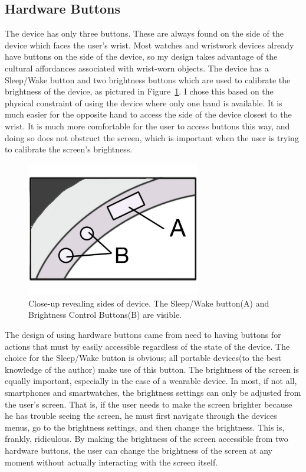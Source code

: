 \documentclass[11pt]{article}
\begin{document}
\subsection{Hardware Buttons}
The device has only three buttons. These are always found on the side of the device which faces the user's wrist. Most watches and wristwork devices already have buttons on the side of the device, so my design takes advantage of the cultural affordances associated with wrist-worn objects. The device has a Sleep/Wake button and two brightness buttons which are used to calibrate the brightness of the device, as pictured in Figure~\ref{fig:buttons}. I chose this based on the physical constraint of using the device where only one hand is available. It is much easier for the opposite hand to access the side of the device closest to the wrist. It is much more comfortable for the user to access buttons this way, and doing so does not obstruct the screen, which is important when the user is trying to calibrate the screen's brightness. 

\begin{figure}[H] %
   \centering
   \includegraphics[width=3in]{buttons.pdf}   
   \caption{Close-up revealing sides of device. The Sleep/Wake button(A) and Brightness Control Buttons(B) are visible.}
   \label{fig:buttons}
\end{figure}

The design of using hardware buttons came from need to having buttons for actions that must by easily accessible regardless of the state of the device. The choice for the Sleep/Wake button is obvious; all portable devices(to the best knowledge of the author) make use of this button. The brightness of the screen is equally important, especially in the case of a wearable device. In most, if not all, smartphones and smartwatches, the brightness settings can only be adjusted from the user's screen. That is, if the user needs to make the screen brighter because he has trouble seeing the screen, he must first navigate through the devices menus, go to the brightness settings, and then change the brightness. This is, frankly, ridiculous. By making the brightness of the screen accessible from two hardware buttons, the user can change the brightness of the screen at any moment without actually interacting with the screen itself.
\end{document}
